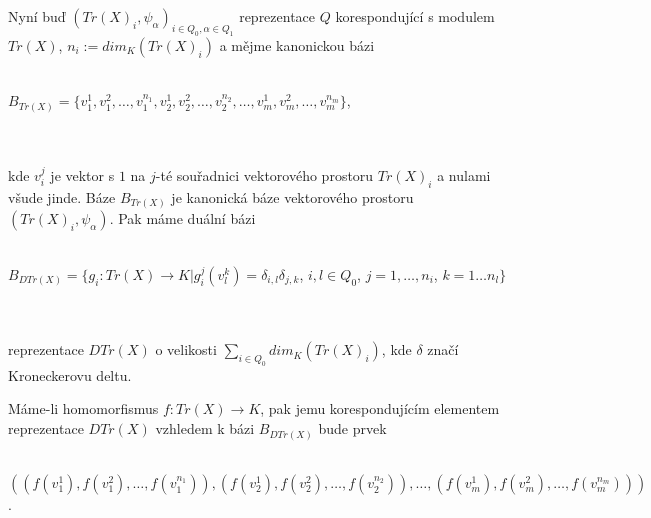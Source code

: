       Nyní buď $(Tr(X)_i, \psi_\alpha)_{i\in Q_0,\alpha\in Q_1}$ reprezentace $Q$ korespondující s modulem 
      $Tr(X)$, $n_i:=dim_K(Tr(X)_i)$ a mějme kanonickou bázi \\\\
      \centerline{
        $B_{Tr(X)}=\{v_1^1,v_1^2,\ldots,v_1^{n_1},
                            v_2^1,v_2^2,\ldots,v_2^{n_2},
                            \ldots,
                            v_m^1,v_m^2,\ldots,v_m^{n_m}
        \}$,} \\\\ 
      kde $v_i^j$ je vektor s $1$ na $j$-té souřadnici vektorového prostoru $Tr(X)_i$
      a nulami všude jinde. Báze $B_{Tr(X)}$ je kanonická báze vektorového  prostoru  
      $(Tr(X)_i, \psi_\alpha)$. Pak máme duální bázi\\\\
      \centerline{$
        B_{DTr(X)}=\{g_i:Tr(X)\rightarrow K|g_i^j(v_l^k)=\delta_{i,l}\delta_{j,k}
        $, $i,l\in Q_0
        $, $j=1,\ldots,n_i
        $, $k=1\ldots n_l\}
      $} \\\\ 
      reprezentace $DTr(X)$ o velikosti $\sum_{i\in Q_0}dim_K(Tr(X)_i)$, kde $\delta$ 
      značí Kroneckerovu deltu.
      
      Máme-li homomorfismus $f:Tr(X)\rightarrow  K$, pak jemu 
      korespondujícím elementem reprezentace $DTr(X)$ vzhledem k bázi $B_{DTr(X)}$ bude prvek \\\\
      \centerline{$(
      (f(v_1^1), f(v_1^2), \ldots, f(v_1^{n_1})), 
      (f(v_2^1), f(v_2^2), \ldots, f(v_2^{n_2})), 
      \ldots,
      (f(v_m^1), f(v_m^2), \ldots, f(v_m^{n_m}))
      )$.}

